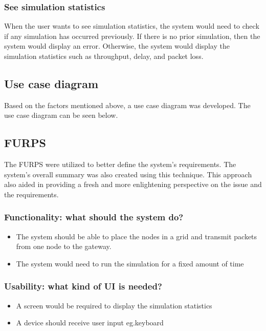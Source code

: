 \subsubsection{See simulation statistics}
When the user wants to see simulation statistics, the system would need to check if any simulation has occurred previously. If there is no prior simulation, then the system would display an error. Otherwise, the system would display the simulation statistics such as throughput, delay, and packet loss.

\subsection{Use case diagram}
Based on the factors mentioned above, a use case diagram was developed. The use case diagram can be seen below.

\subsection{FURPS}

The FURPS were utilized to better define the system's requirements. The system's overall summary was also created using this technique. This approach also aided in providing a fresh and more enlightening perspective on the issue and the requirements.

\subsubsection{Functionality: what should the system do?}
\begin{itemize}
  \item The system should be able to place the nodes in a grid and transmit packets from one node to the gateway.


  \item The system would need to run the simulation for a fixed amount of time


\end{itemize}

\subsubsection{Usability: what kind of UI is needed?}
\begin{itemize}
  \item A screen would be required to display the simulation statistics
  \item A device should receive user input eg.keyboard
\end{itemize}

